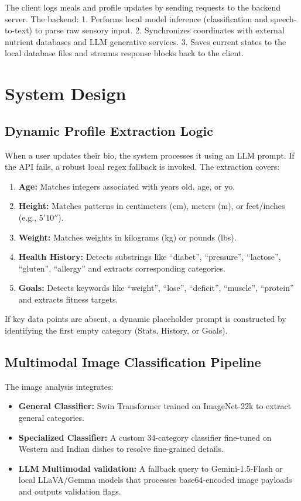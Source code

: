 \documentclass[12pt,a4paper,oneside]{report}
\begin{document}
The client logs meals and profile updates by sending requests to the backend server. The backend:
1. Performs local model inference (classification and speech-to-text) to parse raw sensory input.
2. Synchronizes coordinates with external nutrient databases and LLM generative services.
3. Saves current states to the local database files and streams response blocks back to the client.

\section{System Design}

\subsection{Dynamic Profile Extraction Logic}
When a user updates their bio, the system processes it using an LLM prompt. If the API fails, a robust local regex fallback is invoked. The extraction covers:
\begin{enumerate}
    \item \textbf{Age:} Matches integers associated with years old, age, or yo.
    \item \textbf{Height:} Matches patterns in centimeters (cm), meters (m), or feet/inches (e.g., $5'10''$).
    \item \textbf{Weight:} Matches weights in kilograms (kg) or pounds (lbs).
    \item \textbf{Health History:} Detects substrings like ``diabet'', ``pressure'', ``lactose'', ``gluten'', ``allergy'' and extracts corresponding categories.
    \item \textbf{Goals:} Detects keywords like ``weight'', ``lose'', ``deficit'', ``muscle'', ``protein'' and extracts fitness targets.
\end{enumerate}

If key data points are absent, a dynamic placeholder prompt is constructed by identifying the first empty category (Stats, History, or Goals).

\subsection{Multimodal Image Classification Pipeline}
The image analysis integrates:
\begin{itemize}
    \item \textbf{General Classifier:} Swin Transformer trained on ImageNet-22k to extract general categories.
    \item \textbf{Specialized Classifier:} A custom 34-category classifier fine-tuned on Western and Indian dishes to resolve fine-grained details.
    \item \textbf{LLM Multimodal validation:} A fallback query to Gemini-1.5-Flash or local LLaVA/Gemma models that processes base64-encoded image payloads and outputs validation flags.
\end{itemize}
\end{document}
